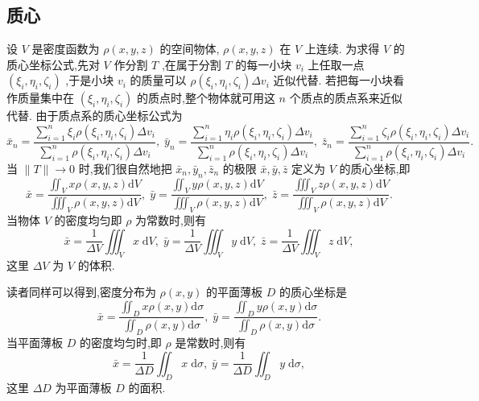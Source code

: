 \subsection{质心}

设 \(V\) 是密度函数为 \(\rho \left( {x,y,z}\right)\) 的空间物体, \(\rho \left( {x,y,z}\right)\) 在 \(V\) 上连续. 为求得 \(V\) 的质心坐标公式,先对 \(V\) 作分割 \(T\) ,在属于分割 \(T\) 的每一小块 \({v}_{i}\) 上任取一点 \(\left( {{\xi }_{i},{\eta }_{i},{\zeta }_{i}}\right)\) ,于是小块 \({v}_{i}\) 的质量可以 \(\rho \left( {{\xi }_{i},{\eta }_{i},{\zeta }_{i}}\right) \Delta {v}_{i}\) 近似代替. 若把每一小块看作质量集中在 \(\left( {{\xi }_{i},{\eta }_{i},{\zeta }_{i}}\right)\) 的质点时,整个物体就可用这 \(n\) 个质点的质点系来近似代替. 由于质点系的质心坐标公式为
\[
{\bar{x}}_{n} = \frac{\mathop{\sum }\limits_{{i = 1}}^{n}{\xi }_{i}\rho \left( {{\xi }_{i},{\eta }_{i},{\zeta }_{i}}\right) \Delta {v}_{i}}{\mathop{\sum }\limits_{{i = 1}}^{n}\rho \left( {{\xi }_{i},{\eta }_{i},{\zeta }_{i}}\right) \Delta {v}_{i}},\;{\bar{y}}_{n} = \frac{\mathop{\sum }\limits_{{i = 1}}^{n}{\eta }_{i}\rho \left( {{\xi }_{i},{\eta }_{i},{\zeta }_{i}}\right) \Delta {v}_{i}}{\mathop{\sum }\limits_{{i = 1}}^{n}\rho \left( {{\xi }_{i},{\eta }_{i},{\zeta }_{i}}\right) \Delta {v}_{i}},\;{\bar{z}}_{n} = \frac{\mathop{\sum }\limits_{{i = 1}}^{n}{\zeta }_{i}\rho \left( {{\xi }_{i},{\eta }_{i},{\zeta }_{i}}\right) \Delta {v}_{i}}{\mathop{\sum }\limits_{{i = 1}}^{n}\rho \left( {{\xi }_{i},{\eta }_{i},{\zeta }_{i}}\right) \Delta {v}_{i}}.
\]
当 \(\parallel T\parallel  \rightarrow  0\) 时,我们很自然地把 \({\bar{x}}_{n},{\bar{y}}_{n},{\bar{z}}_{n}\) 的极限 \(\bar{x},\bar{y},\bar{z}\) 定义为 \(V\) 的质心坐标,即
\[
\bar{x} = \frac{{\iint }_{V}{x\rho }\left( {x,y,z}\right) \mathrm{d}V}{{\iiint }_{V}\rho \left( {x,y,z}\right) \mathrm{d}V},\;\bar{y} = \frac{{\iint }_{V}{y\rho }\left( {x,y,z}\right) \mathrm{d}V}{{\iiint }_{V}\rho \left( {x,y,z}\right) \mathrm{d}V},\;\bar{z} = \frac{{\iiint }_{V}{z\rho }\left( {x,y,z}\right) \mathrm{d}V}{{\iiint }_{V}\rho \left( {x,y,z}\right) \mathrm{d}V}.
\]
当物体 \(V\) 的密度均匀即 \(\rho\) 为常数时,则有
\[
\bar{x} = \frac{1}{\Delta V}{\iiint }_{V}x\mathrm{\;d}V,\;\bar{y} = \frac{1}{\Delta V}{\iiint }_{V}y\mathrm{\;d}V,\;\bar{z} = \frac{1}{\Delta V}{\iiint }_{V}z\mathrm{\;d}V,
\]
这里 \({\Delta V}\) 为 \(V\) 的体积.

读者同样可以得到,密度分布为 \(\rho \left( {x,y}\right)\) 的平面薄板 \(D\) 的质心坐标是
\[
\bar{x} = \frac{{\iint }_{D}{x\rho }\left( {x,y}\right) \mathrm{d}\sigma }{{\iint }_{D}\rho \left( {x,y}\right) \mathrm{d}\sigma },\;\bar{y} = \frac{{\iint }_{D}{y\rho }\left( {x,y}\right) \mathrm{d}\sigma }{{\iint }_{D}\rho \left( {x,y}\right) \mathrm{d}\sigma }.
\]
当平面薄板 \(D\) 的密度均匀时,即 \(\rho\) 是常数时,则有
\[
\bar{x} = \frac{1}{\Delta D}{\iint }_{D}x\mathrm{\;d}\sigma ,\;\bar{y} = \frac{1}{\Delta D}{\iint }_{D}y\mathrm{\;d}\sigma ,
\]
这里 \({\Delta D}\) 为平面薄板 \(D\) 的面积.

